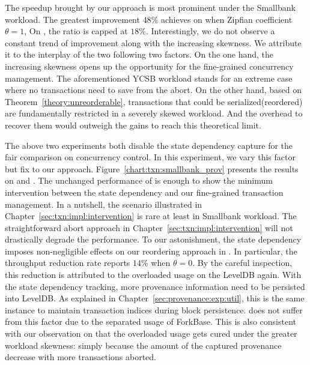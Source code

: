 The speedup brought by our approach is most prominent under the Smallbank workload. 
The greatest improvement $48$\% achieves on {\fsPrF} when Zipfian coefficient $\theta=1$,
On {\fsF}, the ratio is capped at $18$\%.
Interestingly, we do not observe a constant trend of improvement along with the increasing skewness. 
We attribute it to the interplay of the two following two factors. 
On the one hand, the increasing skewness opens up the opportunity for the fine-grained concurrency management. 
The aforementioned YCSB workload stands for an extreme case where no transactions need to save from the abort. 
On the other hand, based on Theorem~\ref{theory:unreorderable}, transactions that could be serialized(reordered) are fundamentally restricted in a severely skewed workload. 
And the overhead to recover them would outweigh the gains to reach this theoretical limit. 

The above two experiments both disable the state dependency capture for the fair comparison on concurrency control. 
In this experiment, we vary this factor but fix to our approach. 
Figure~\ref{chart:txn:smallbank_prov} presents the results on {\fsPrF} and {\fsF}. 
The unchanged performance of {\fsF} is enough to show the minimum intervention
between the state dependency and our fine-grained transaction management. 
In a nutshell, the scenario illustrated in Chapter~\ref{sec:txn:impl:intervention} is rare at least in Smallbank workload. 
The straightforward abort approach in Chapter~\ref{sec:txn:impl:intervention} will not drastically degrade the performance. 
To our astonishment, the state dependency imposes non-negligible effects on our reordering approach in {\fsPrF}.
In particular, the throughput reduction rate reports $14$\% when $\theta=0$.
By the careful inspection, this reduction is attributed to the overloaded usage on the LevelDB again. 
With the state dependency tracking, more provenance information need to be persisted into LevelDB.
As explained in Chapter~\ref{sec:provenance:exp:util}, this is the same instance to maintain transaction indices during block persistence. 
{\fsF} does not suffer from this factor due to the separated usage of ForkBase. 
This is also consistent with our observation on {\fsPrF} that 
the overloaded usage gets cured under the greater workload skewness:
simply because the amount of the captured provenance decrease with more transactions aborted. 

